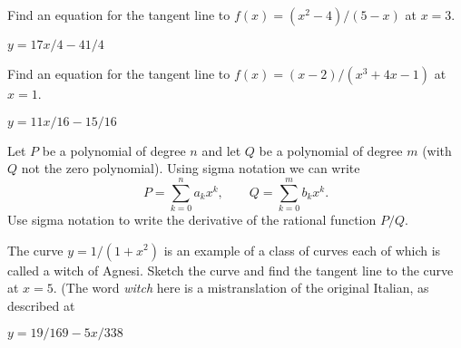 \begin{exercises}
\begin{exercise} Find an equation for the tangent line to $f(x) = (x^2 -
4)/(5-x)$ at $x= 3$.  
\begin{answer} $y=17x/4-41/4$ 
\end{answer}\end{exercise}

\begin{exercise}  Find an equation for the tangent line to 
$f(x) = (x-2)/(x^3 + 4x - 1)$ at $x=1$.
\begin{answer} $y=11x/16-15/16$
\end{answer}\end{exercise}

\begin{exercise} Let $P$ be a polynomial of degree $n$ and let $Q$ be a
polynomial of degree $m$ (with $Q$ not the zero polynomial). 
Using sigma notation we can write
$$P=\sum _{k=0 } ^n a_k x^k,\qquad
Q=\sum_{k=0}^m b_k x^k.
$$
Use sigma notation to write the derivative of the 
{\dfont rational function}
$P/Q$.
\end{exercise}

\begin{exercise} The curve $y=1/(1+x^2)$ is an example of a class of
curves each of which is called a {\dfont witch of
Agnesi}. 
Sketch the curve and find the tangent line to the curve at
$x= 5$. (The word {\em witch\/} here is a mistranslation of the
original Italian, as described at
\begin{answer} $y=19/169-5x/338$
\end{answer}\end{exercise}
 

\end{exercises}
